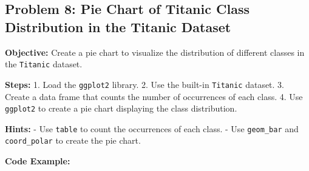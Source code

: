 \documentclass[
  letterpaper,
  DIV=11,
  numbers=noendperiod]{scrreprt}
\newenvironment{Shaded}{\begin{snugshade}}{\end{snugshade}}
\newcommand{\AttributeTok}[1]{\textcolor[rgb]{0.40,0.45,0.13}{#1}}
\newcommand{\CommentTok}[1]{\textcolor[rgb]{0.37,0.37,0.37}{#1}}
\newcommand{\DecValTok}[1]{\textcolor[rgb]{0.68,0.00,0.00}{#1}}
\newcommand{\FunctionTok}[1]{\textcolor[rgb]{0.28,0.35,0.67}{#1}}
\newcommand{\NormalTok}[1]{\textcolor[rgb]{0.00,0.23,0.31}{#1}}
\newcommand{\OtherTok}[1]{\textcolor[rgb]{0.00,0.23,0.31}{#1}}
\newcommand{\SpecialCharTok}[1]{\textcolor[rgb]{0.37,0.37,0.37}{#1}}
\newcommand{\StringTok}[1]{\textcolor[rgb]{0.13,0.47,0.30}{#1}}
\begin{document}
\subsection*{Problem 8: Pie Chart of Titanic Class Distribution in the
Titanic
Dataset}\label{problem-8-pie-chart-of-titanic-class-distribution-in-the-titanic-dataset}

\textbf{Objective:} Create a pie chart to visualize the distribution of
different classes in the \texttt{Titanic} dataset.

\textbf{Steps:} 1. Load the \texttt{ggplot2} library. 2. Use the
built-in \texttt{Titanic} dataset. 3. Create a data frame that counts
the number of occurrences of each class. 4. Use \texttt{ggplot2} to
create a pie chart displaying the class distribution.

\textbf{Hints:} - Use \texttt{table} to count the occurrences of each
class. - Use \texttt{geom\_bar} and \texttt{coord\_polar} to create the
pie chart.

\textbf{Code Example:}

\begin{Shaded}
\end{Shaded}
\end{document}
